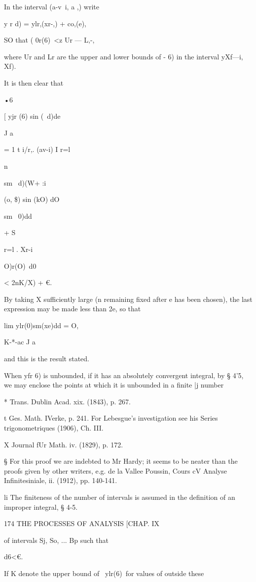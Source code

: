 In the interval (a-v\ i, a ,) write

y r d) = ylr,(xr-,) + co,(e),

SO that ( 0r(6)\ <z Ur — L,-,

where Ur and Lr are the upper and lower bounds of - 6) in the interval
yXf—i, Xf).

It is then clear that

•6

[ yjr (6) sin (\ d)de

J a

= 1 t i/r,. (av-i) I r=l

n

sm \ d)(W+ :i

(o, \$) sin (kO) dO

sm \ 0)dd

+ S

r=l . Xr-i

O)r(O)\ d0

< 2nK/X) + €.

By taking X sufficiently large (n remaining fixed after e has been
chosen), the last expression may be made less than 2e, so that

lim ylr(0)sm(xe)dd = O,

K-*-ac J a

and this is the result stated.

When yfr 6) is unbounded, if it has an absolutely convergent integral,
by § 4'5, we may enclose the points at which it is unbounded in a
finite |j number

* Trans. Dublin Acad. xix. (1843), p. 267.

t Ges. Math. IVerke, p. 241. For Lebesgue's investigation see his
Series trigonometriques (1906), Ch. III.

X Journal fUr Math. iv. (1829), p. 172.

§ For this proof we are indebted to Mr Hardy; it seems to be neater
than the proofs given by other writers, e.g. de la Vallee Poussin,
Cours cV Analyse Infinitesiniale, ii. (1912), pp. 140-141.

li The finiteness of the number of intervals is assumed in the
definition of an improper integral, § 4-5.

174 THE PROCESSES OF ANALYSIS [CHAP. IX

of intervals Sj, So, ... Bp such that

d6<€.

If K denote the upper bound of \ ylr(6)\ for values of outside these

